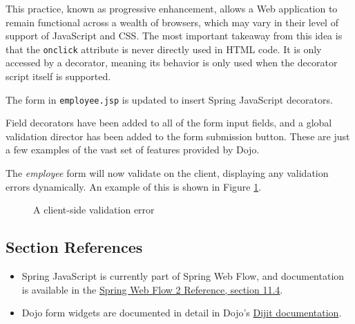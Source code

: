 \documentclass{article}
\begin{document}
This practice, known as progressive enhancement, allows a Web application to remain functional across a wealth of browsers, which may vary in their level of support of JavaScript and CSS.  The most important takeaway from this idea is that the \texttt{onclick} attribute is never directly used in HTML code.  It is only accessed by a decorator, meaning its behavior is only used when the decorator script itself is supported.

The form in \texttt{employee.jsp} is updated to insert Spring JavaScript decorators.



Field decorators have been added to all of the form input fields, and a global validation director has been added to the form submission button.  These are just a few examples of the vast set of features provided by Dojo.

The \emph{employee} form will now validate on the client, displaying any validation errors dynamically.  An example of this is shown in Figure \ref{fig:client-side-validation/employee}.

\vspace{10pt}
\begin{figure}[H]
\begin{center}
\end{center}
\caption{A client-side validation error}
\label{fig:client-side-validation/employee}
\end{figure}

\subsection{Section References}

\begin{itemize}
\item Spring JavaScript is currently part of Spring Web Flow, and documentation is available in the \href{http://static.springsource.org/spring-webflow/docs/2.0.x/reference/html/ch11s04.html}{Spring Web Flow 2 Reference, section 11.4}.
\item Dojo form widgets are documented in detail in Dojo's \href{http://docs.dojocampus.org/dijit/form/}{Dijit documentation}.
\end{itemize}
\end{document}
